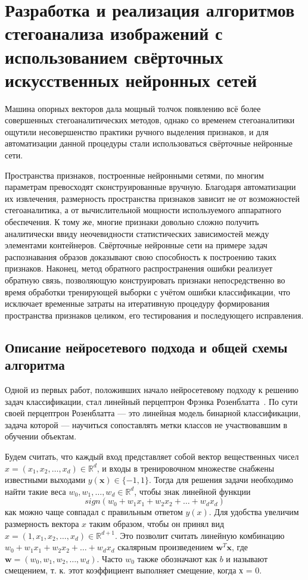 
\section{Разработка и реализация алгоритмов стегоанализа изображений с использованием свёрточных искусственных нейронных сетей}

Машина опорных векторов дала мощный толчок появлению всё более совершенных стегоаналитических методов, однако со временем стегоаналитики ощутили несовершенство практики ручного выделения признаков, и для автоматизации данной процедуры стали использоваться свёрточные нейронные сети.

Пространства признаков, построенные нейронными сетями, по многим параметрам превосходят сконструированные вручную. Благодаря автоматизации их извлечения, размерность пространства признаков зависит не от возможностей стегоаналитика, а от вычислительной мощности используемого аппаратного обеспечения. К тому же, многие признаки довольно сложно получить аналитически ввиду неочевидности статистических зависимостей между элементами контейнеров. Свёрточные нейронные сети на примере задач распознавания образов доказывают свою способность к построению таких признаков. Наконец, метод обратного распространения ошибки реализует обратную связь, позволяющую конструировать признаки непосредственно во время обработки тренирующей выборки с учётом ошибки классификации, что исключает временные затраты на итеративную процедуру формирования пространства признаков целиком, его тестирования и последующего исправления.

\subsection{Описание нейросетевого подхода и общей схемы алгоритма}

Одной из первых работ, положивших начало нейросетевому подходу к решению задач классификации, стал линейный перцептрон Фрэнка Розенблатта~\cite{Rosenblatt1, Rosenblatt2}. По сути своей перцептрон Розенблатта --- это линейная модель бинарной классификации, задача которой --- научиться сопоставлять метки классов не участвовавшим в обучении объектам.

Будем считать, что каждый вход представляет собой вектор вещественных чисел $ x = (x_1, x_2, \ldots, x_d) \in \mathbb{R}^d $, и входы в тренировочном множестве снабжены известными выходами $ y(\mathbf{x}) \in \{-1, 1\} $. Тогда для решения задачи необходимо найти такие веса $ w_0, w_1, \ldots, w_d \in \mathbb{R}^d $, чтобы знак линейной функции
\begin{equation*}
sign(w_0 + w_1x_1 + w_2x_2 + \ldots + w_dx_d)
\end{equation*}
как можно чаще совпадал с правильным ответом $ y(x) $. Для удобства увеличим размерность вектора $ x $ таким образом, чтобы он принял вид $ x = (1, x_1, x_2, \ldots, x_d) \in \mathbb{R}^{d + 1} $. Это позволит считать линейную комбинацию $ w_0 + w_1x_1 + w_2x_2 + \ldots + w_dx_d $ скалярным произведением $ \mathbf{w}^T\mathbf{x} $, где $ \mathbf{w} = (w_0, w_1, w_2, \ldots, w_d) $. Часто $ w_0 $ также обозначают как $ b $ и называют смещением, т. к. этот коэффициент выполняет смещение, когда х = 0.

